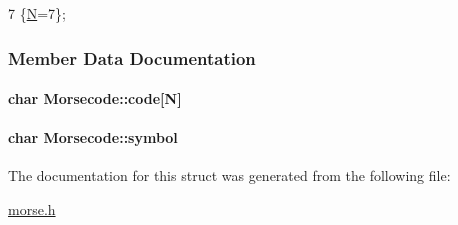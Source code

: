 \begin{DoxyCode}
7 \{\hyperlink{structMorsecode_ad8b781b4f5aa87b0afdef835324bcf24a352dad4a744b50bf7d7db44a4959260f}{N}=7\};
\end{DoxyCode}


\subsubsection{Member Data Documentation}
\hypertarget{structMorsecode_abb81632acf39b9e91f76bd09b12fc0e0}{
\paragraph[{code}]{\setlength{\rightskip}{0pt plus 5cm}char Morsecode\+::code\mbox{[}{\bf N}\mbox{]}}}\label{structMorsecode_abb81632acf39b9e91f76bd09b12fc0e0}
\hypertarget{structMorsecode_a8f7fb86f9de77dc705dc37730e83869b}{
\paragraph[{symbol}]{\setlength{\rightskip}{0pt plus 5cm}char Morsecode\+::symbol}}\label{structMorsecode_a8f7fb86f9de77dc705dc37730e83869b}


The documentation for this struct was generated from the following file\+:\begin{DoxyCompactItemize}
\item 
\hyperlink{morse_8h}{morse.\+h}\end{DoxyCompactItemize}

